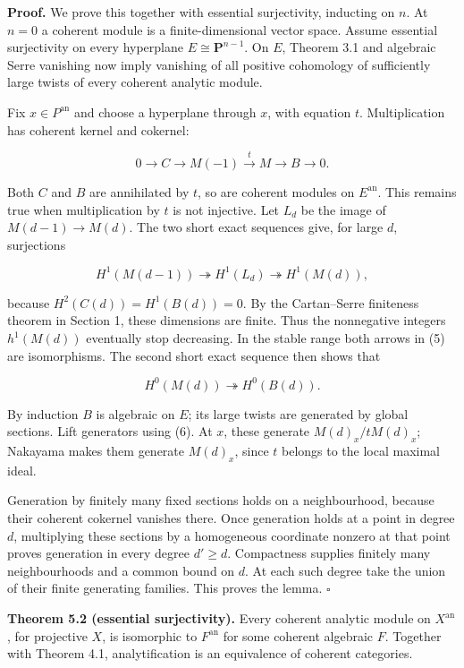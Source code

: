 \documentclass[11pt]{article}
\begin{document}
\textbf{Proof.} We prove this together with essential surjectivity,
inducting on \(n\). At \(n=0\) a coherent module is a finite-dimensional
vector space. Assume essential surjectivity on every hyperplane
\(E\cong\mathbf P^{n-1}\). On \(E\), Theorem 3.1 and algebraic Serre
vanishing now imply vanishing of all positive cohomology of sufficiently
large twists of every coherent analytic module.

Fix \(x\in P^{\mathrm{an}}\) and choose a hyperplane through \(x\), with
equation \(t\). Multiplication has coherent kernel and cokernel:

\[
0\to C\to M(-1)\xrightarrow{t}M\to B\to0.
\]

Both \(C\) and \(B\) are annihilated by \(t\), so are coherent modules
on \(E^{\mathrm{an}}\). This remains true when multiplication by \(t\)
is not injective. Let \(L_d\) be the image of \(M(d-1)\to M(d)\). The
two short exact sequences give, for large \(d\), surjections

\[
H^1(M(d-1))\twoheadrightarrow H^1(L_d)
\twoheadrightarrow H^1(M(d)),
\tag{5}
\]

because \(H^2(C(d))=H^1(B(d))=0\). By the Cartan--Serre finiteness
theorem in Section 1, these dimensions are finite. Thus the nonnegative
integers \(h^1(M(d))\) eventually stop decreasing. In the stable range
both arrows in (5) are isomorphisms. The second short exact sequence
then shows that

\[
H^0(M(d))\twoheadrightarrow H^0(B(d)).
\tag{6}
\]

By induction \(B\) is algebraic on \(E\); its large twists are generated
by global sections. Lift generators using (6). At \(x\), these generate
\(M(d)_x/tM(d)_x\); Nakayama makes them generate \(M(d)_x\), since \(t\)
belongs to the local maximal ideal.

Generation by finitely many fixed sections holds on a neighbourhood,
because their coherent cokernel vanishes there. Once generation holds at
a point in degree \(d\), multiplying these sections by a homogeneous
coordinate nonzero at that point proves generation in every degree
\(d'\geq d\). Compactness supplies finitely many neighbourhoods and a
common bound on \(d\). At each such degree take the union of their
finite generating families. This proves the lemma. \(\square\)

\textbf{Theorem 5.2 (essential surjectivity).} Every coherent analytic
module on \(X^{\mathrm{an}}\), for projective \(X\), is isomorphic to
\(F^{\mathrm{an}}\) for some coherent algebraic \(F\). Together with
Theorem 4.1, analytification is an equivalence of coherent categories.
\end{document}
